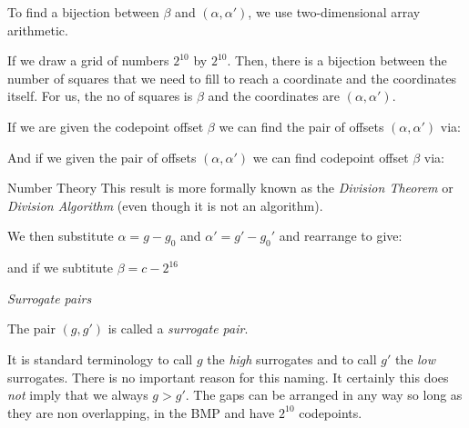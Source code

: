 To find a bijection between $\beta$ and $(\alpha,\alpha')$, we use 
two-dimensional array arithmetic. 

If we draw a grid of numbers $2^{10}$ by $2^{10}$. Then, 
there is a bijection between the number of squares that we need 
to fill to reach a coordinate and the coordinates itself. 
For us, the no of squares is $\beta$ and the coordinates are 
$(\alpha,\alpha')$. 

If we are given the codepoint offset $\beta$ we can find the pair of offsets $(\alpha,\alpha')$ via:

And if we given the pair of offsets $(\alpha,\alpha')$ we can find 
codepoint offset $\beta$ via:


\begin{sidenote}{Number Theory}
This result is more formally known as the \textit{Division Theorem} 
or \textit{Division Algorithm} (even though it is not an algorithm). 
\end{sidenote}

We then substitute $ \alpha = g - g_0$  and $\alpha' = g' - g_0'$ and 
rearrange to give:


and if we subtitute $\beta = c - 2^{16}$



\frmrule 

\textit{Surrogate pairs}

The pair $(g,g')$ is called a \textit{surrogate pair}. 

It is standard terminology to call 
$g$ the \textit{high} surrogates and to call $g'$ the \textit{low} surrogates.
There is no important reason for this naming. 
It certainly this does \textit{not} imply that we always $g > g'$. The gaps can 
be arranged in any way so long as they are non overlapping, in the BMP 
and have $2^{10}$ codepoints. 


